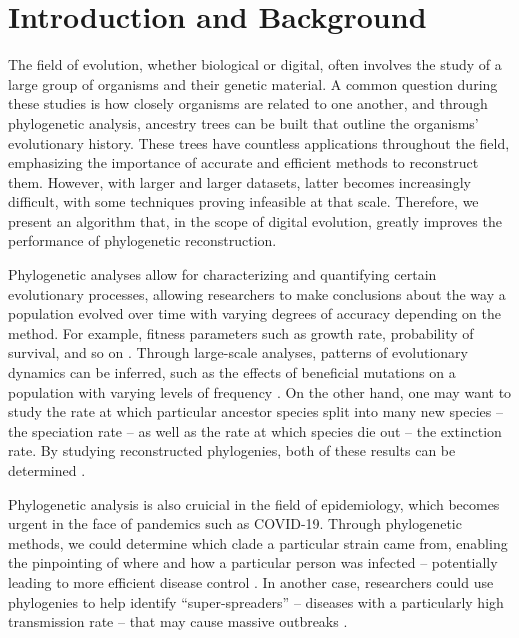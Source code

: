 \section{Introduction and Background} \label{sec:introduction}

The field of evolution, whether biological or digital, often involves the study of a large group of organisms and their genetic material.
A common question during these studies is how closely organisms are related to one another, and through phylogenetic analysis, ancestry trees can be built that outline the organisms' evolutionary history.
These trees have countless applications throughout the field, emphasizing the importance of accurate and efficient methods to reconstruct them.
However, with larger and larger datasets, latter becomes increasingly difficult, with some techniques proving infeasible at that scale.
Therefore, we present an algorithm that, in the scope of digital evolution, greatly improves the performance of phylogenetic reconstruction.

Phylogenetic analyses allow for characterizing and quantifying certain evolutionary processes, allowing researchers to make conclusions about the way a population evolved over time with varying degrees of accuracy depending on the method.
For example, fitness parameters such as growth rate, probability of survival, and so on \citep{genthon2023cell}.
Through large-scale analyses, patterns of evolutionary dynamics can be inferred, such as the effects of beneficial mutations on a population with varying levels of frequency \citep{levy2015quantitative}.
On the other hand, one may want to study the rate at which particular ancestor species split into many new species -- the speciation rate -- as well as the rate at which species die out -- the extinction rate.
By studying reconstructed phylogenies, both of these results can be determined \citep{stadler2013recovering}.

Phylogenetic analysis is also cruicial in the field of epidemiology, which becomes urgent in the face of pandemics such as COVID-19.
Through phylogenetic methods, we could determine which clade a particular strain came from, enabling the pinpointing of where and how a particular person was infected -- potentially leading to more efficient disease control \citep{wang2020role}.
In another case, researchers could use phylogenies to help identify ``super-spreaders'' -- diseases with a particularly high transmission rate -- that may cause massive outbreaks \citep{colijn2014phylogenetic}.

